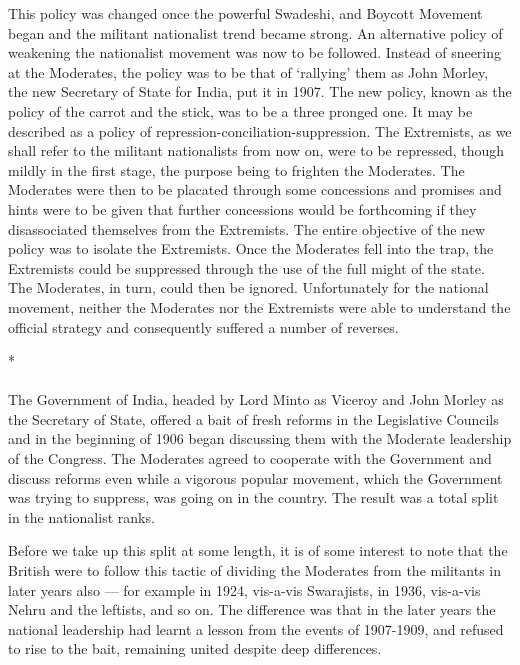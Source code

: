 This policy was changed once the powerful Swadeshi, and Boycott Movement began and the militant nationalist trend became strong. An alternative policy of weakening the nationalist movement was now to be followed. Instead of sneering at the Moderates, the policy was to be that of `rallying' them as John Morley, the new Secretary of State for India, put it in 1907. The new policy, known as the policy of the carrot and the stick, was to be a three pronged one. It may be described as a policy of repression-conciliation-suppression. The Extremists, as we shall refer to the militant nationalists from now on, were to be repressed, though mildly in the first stage, the purpose being to frighten the Moderates. The Moderates were then to be placated through some concessions and promises and hints were to be given that further concessions would be forthcoming if they disassociated themselves from the Extremists. The entire objective of the new policy was to isolate the Extremists. Once the Moderates fell into the trap, the Extremists could be suppressed through the use of the full might of the state. The Moderates, in turn, could then be ignored. Unfortunately for the national movement, neither the Moderates nor the Extremists were able to understand the official strategy and consequently suffered a number of reverses.

\begin{center}*\end{center}

\paragraph*{}


The Government of India, headed by Lord Minto as Viceroy and John Morley as the Secretary of State, offered a bait of fresh reforms in the Legislative Councils and in the beginning of 1906 began discussing them with the Moderate leadership of the Congress. The Moderates agreed to cooperate with the Government and discuss reforms even while a vigorous popular movement, which the Government was trying to suppress, was going on in the country. The result was a total split in the nationalist ranks.

Before we take up this split at some length, it is of some interest to note that the British were to follow this tactic of dividing the Moderates from the militants in later years also — for example in 1924, vis-a-vis Swarajists, in 1936, vis-a-vis Nehru and the leftists, and so on. The difference was that in the later years the national leadership had learnt a lesson from the events of 1907-1909, and refused to rise to the bait, remaining united despite deep differences.

